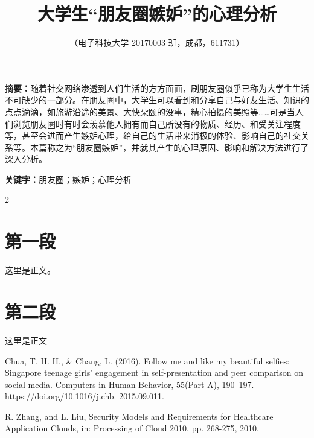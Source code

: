 \documentclass[fontset=fandol]{ctexart}
\title{大学生“朋友圈嫉妒”的心理分析}
\date{}
\author{（电子科技大学 20170003 班，成都，611731）}
\begin{document}
\pagestyle{fancy}

\maketitle
\thispagestyle{fancy}

{\bfseries 摘要：}随着社交网络渗透到人们生活的方方面面，刷朋友圈似乎已称为大学生生活不可缺少的一部分。在朋友圈中，大学生可以看到和分享自己与好友生活、知识的点点滴滴，如旅游沿途的美景、大快朵颐的没事，精心拍摄的美照等……可是当人们浏览朋友圈时有时会羡慕他人拥有而自己所没有的物质、经历、和受关注程度等，甚至会进而产生嫉妒心理，给自己的生活带来消极的体验、影响自己的社交关系等。本篇称之为“朋友圈嫉妒”，并就其产生的心理原因、影响和解决方法进行了深入分析。

{\bfseries 关键字：}朋友圈；嫉妒；心理分析

\begin{multicols}{2} %
\section{第一段}
这里是正文。\lipsum[1]

\section{第二段}
这里是正文 \lipsum[2]
\end{multicols}

\begin{thebibliography}{}
	
	Chua, T. H. H., \& Chang, L. (2016). Follow me and like my beautiful selfies: Singapore teenage girls’ engagement in self-presentation and peer comparison on social media. Computers in Human Behavior, 55(Part A), 190–197. https://doi.org/10.1016/j.chb. 2015.09.011. 
	
	R. Zhang, and L. Liu, Security Models and Requirements for Healthcare Application Clouds, in: Processing of  Cloud 2010, pp. 268-275, 2010.
\end{thebibliography}
\end{document}
